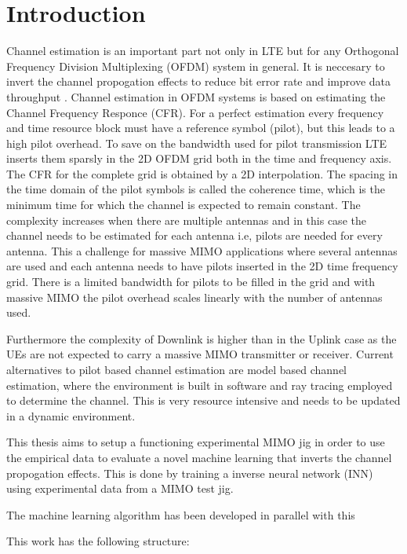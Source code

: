 \chapter{Introduction}
\label{ch:intro}

Channel estimation is an important part not only in LTE but for any Orthogonal Frequency Division Multiplexing (OFDM) system in general. It is neccesary to invert the channel propogation effects to reduce bit error rate and improve data throughput \cite{ChEst,CHEstPilotBased}. Channel estimation in OFDM systems is based on estimating the Channel Frequency Responce (CFR). For a perfect estimation every frequency and time resource block must have a reference symbol (pilot), but this leads to a high pilot overhead. To save on the bandwidth used for pilot transmission LTE inserts them sparsly in the 2D OFDM grid both in the time and frequency axis. The CFR for the complete grid is obtained by a 2D interpolation. The spacing in the time domain of the pilot symbols is called the coherence time, which is the minimum time for which the channel is expected to remain constant. The complexity increases when there are multiple antennas and in this case the channel needs to be estimated for each antenna i.e, pilots are needed for every antenna. This a challenge for massive MIMO applications where several antennas are used and each antenna needs to have pilots inserted in the 2D time frequency grid. There is a limited bandwidth for pilots to be filled in the grid and with massive MIMO the pilot overhead scales linearly with the number of antennas used.

Furthermore the complexity of Downlink is higher than in the Uplink case as the UEs are not expected to carry a massive MIMO transmitter or receiver. Current alternatives to pilot based channel estimation are model based channel estimation, where the environment is built in software and ray tracing employed to determine the channel. This is very resource intensive and needs to be updated in a dynamic environment.

This thesis aims to setup a functioning experimental MIMO jig in order to use the empirical data to evaluate a novel machine learning that inverts the channel propogation effects. This is done by training a inverse neural network (INN) using experimental data from a MIMO test jig.

The machine learning algorithm has been developed in parallel with this \cite{JMMLINN}

This work has the following structure: \\

